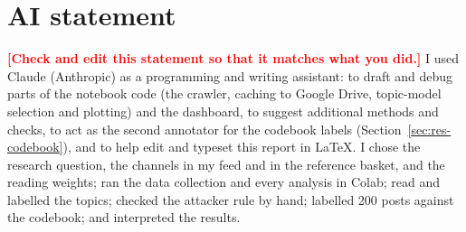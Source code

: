 \documentclass[11pt,a4paper]{article}
\newcommand{\todo}[1]{\textcolor{red}{\textbf{[#1]}}}
\begin{document}
\section*{AI statement}
\todo{Check and edit this statement so that it matches what you did.} I used Claude (Anthropic) as a programming and writing assistant: to draft and debug parts of the notebook code (the crawler, caching to Google Drive, topic-model selection and plotting) and the dashboard, to suggest additional methods and checks, to act as the second annotator for the codebook labels (Section~\ref{sec:res-codebook}), and to help edit and typeset this report in \LaTeX. I chose the research question, the channels in my feed and in the reference basket, and the reading weights; ran the data collection and every analysis in Colab; read and labelled the topics; checked the attacker rule by hand; labelled 200 posts against the codebook; and interpreted the results.

\end{document}
